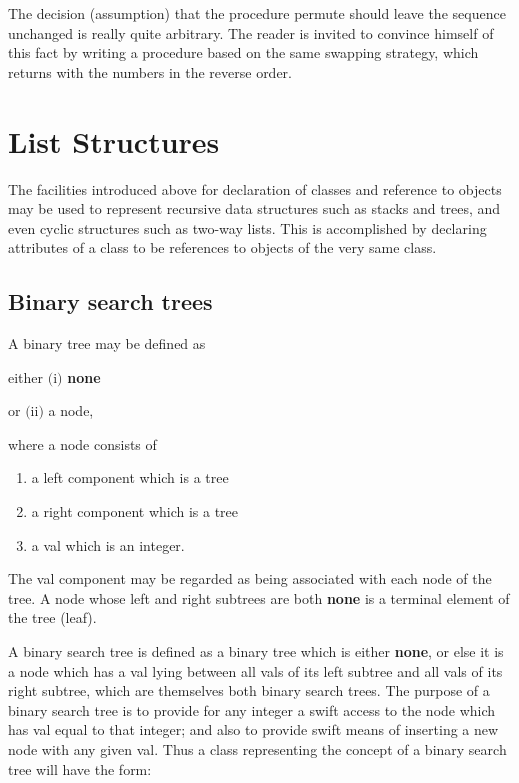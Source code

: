 The decision (assumption) that the procedure permute should leave the sequence unchanged is really quite arbitrary. The reader is invited to convince himself of this fact by writing a procedure based on the same swapping strategy, which returns with the numbers in the reverse order.

\section[List structures]{List Structures}

The facilities introduced above for declaration of classes and reference to
objects may be used to represent recursive data structures such as stacks and
trees, and even cyclic structures such as two-way lists. This is accomplished
by declaring attributes of a class to be references to objects of the very same
class.

\subsection{Binary search trees}

A binary tree may be defined as

\quad either \tabto*{5.35em}$($i$)$ \tabto*{7.35em}\textbf{none}

\tabto*{4em}or $($ii$)$ a node,

\noindent
where a node consists of

\begin{enumerate}[wide, nosep, label=(\alph*)]
	\item a left component which is a tree
	\item a right component which is a tree
	\item a val which is an integer.
\end{enumerate}

\noindent
The val component may be regarded as being associated with each node of the tree. A node whose left and right subtrees are both \textbf{none} is a terminal element of the tree (leaf).

A binary search tree is defined as a binary tree which is either \textbf{none}, or else it is a node which has a val lying between all vals of its left subtree and all vals of its right subtree, which are themselves both binary search trees. The purpose of a binary search tree is to provide for any integer a swift access to the node which has val equal to that integer; and also to provide swift means of inserting a new node with any given val. Thus a class representing the concept of a binary search tree will have the form:

